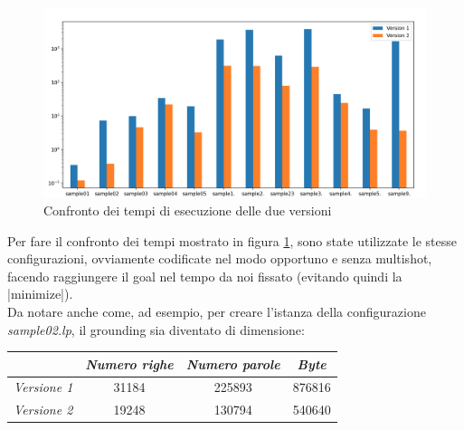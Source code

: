 \documentclass[10pt, a4paper, oneside]{article}
\begin{document}
\begin{figure}[H]
  \centering
  \includegraphics[width=1\textwidth]{../images/stats2.PNG}
  \caption{Confronto dei tempi di esecuzione delle due versioni}
  \label{fig:confronto_tempi}
\end{figure}

\noindent
Per fare il confronto dei tempi mostrato in figura \ref{fig:confronto_tempi}, sono state utilizzate le stesse configurazioni, ovviamente codificate nel modo opportuno e senza multishot, facendo raggiungere il goal nel tempo da noi fissato (evitando quindi la |minimize|). \\




\noindent
Da notare anche come, ad esempio, per creare l'istanza della configurazione \emph{sample02.lp}, il grounding sia diventato di dimensione:


\begin{table}[H]
    \centering
    \begin{tabular}{c|c|c|c|}
    \cline{2-4}
    \textit{\textbf{}}                        & \textit{Numero righe} & \textit{Numero parole} & \textit{Byte} \\ \hline
    \multicolumn{1}{|c|}{\textit{Versione 1}} & 31184                 & 225893                 & 876816       \\ \hline
    \multicolumn{1}{|c|}{\textit{Versione 2}} & 19248                 & 130794                 & 540640       \\ \hline
    \end{tabular}
\end{table}
\end{document}
